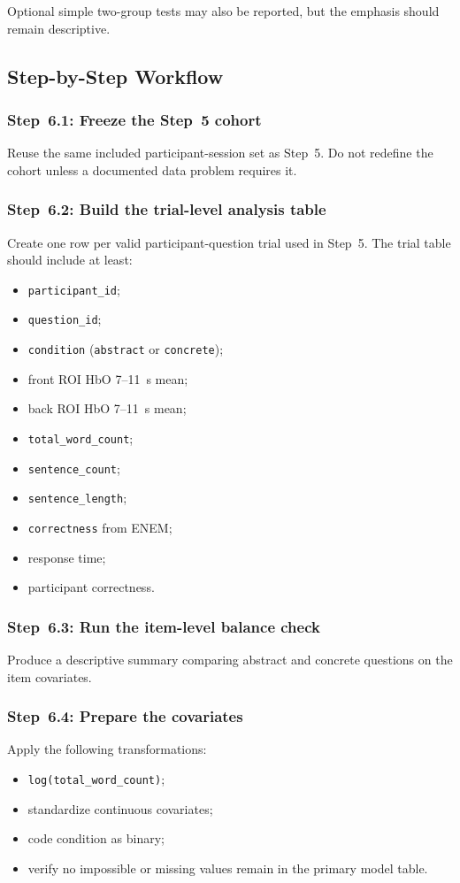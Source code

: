 \documentclass[11pt]{article}
\begin{document}
Optional simple two-group tests may also be reported, but the emphasis should remain descriptive.

\subsection{Step-by-Step Workflow}

\subsubsection{Step~6.1: Freeze the Step~5 cohort}
Reuse the same included participant-session set as Step~5.
Do not redefine the cohort unless a documented data problem requires it.

\subsubsection{Step~6.2: Build the trial-level analysis table}
Create one row per valid participant-question trial used in Step~5.
The trial table should include at least:
\begin{itemize}
    \item \texttt{participant\_id};
    \item \texttt{question\_id};
    \item \texttt{condition} (\texttt{abstract} or \texttt{concrete});
    \item front ROI HbO 7--11~s mean;
    \item back ROI HbO 7--11~s mean;
    \item \texttt{total\_word\_count};
    \item \texttt{sentence\_count};
    \item \texttt{sentence\_length};
    \item \texttt{correctness} from ENEM;
    \item response time;
    \item participant correctness.
\end{itemize}

\subsubsection{Step~6.3: Run the item-level balance check}
Produce a descriptive summary comparing abstract and concrete questions on the item covariates.

\subsubsection{Step~6.4: Prepare the covariates}
Apply the following transformations:
\begin{itemize}
    \item \texttt{log(total\_word\_count)};
    \item standardize continuous covariates;
    \item code condition as binary;
    \item verify no impossible or missing values remain in the primary model table.
\end{itemize}
\end{document}
